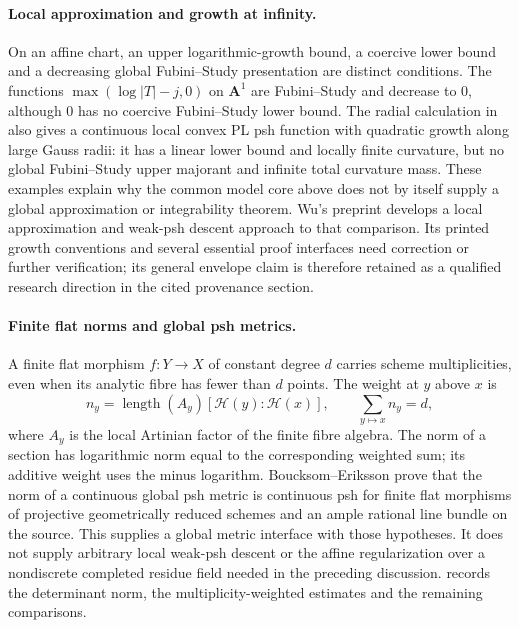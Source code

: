 \paragraph{Local approximation and growth at infinity.}
On an affine chart, an upper logarithmic-growth bound, a coercive lower
bound and a decreasing global Fubini--Study presentation are distinct
conditions. The functions
\(\max(\log|T|-j,0)\) on \(\mathbf A^1\) are Fubini--Study and decrease
to \(0\), although \(0\) has no coercive Fubini--Study lower bound.
The radial calculation in
 also gives a continuous local
convex PL psh function with quadratic growth along large Gauss radii:
it has a linear lower bound and locally finite curvature, but no global
Fubini--Study upper majorant and infinite total curvature mass.
These examples explain why the common model core above does not by
itself supply a global approximation or integrability theorem.
Wu's preprint \cite{Wu26LocalNApshV1} develops a local approximation and
weak-psh descent approach to that comparison. Its printed growth
conventions and several essential proof interfaces need correction or
further verification; its general envelope claim is therefore retained
as a qualified research direction in the cited provenance section.

\paragraph{Finite flat norms and global psh metrics.}
A finite flat morphism \(f:Y\to X\) of constant degree \(d\) carries
scheme multiplicities, even when its analytic fibre has fewer than \(d\)
points. The weight at \(y\) above \(x\) is
\[
 n_y=\operatorname{length}(A_y)
       [\mathcal H(y):\mathcal H(x)],
 \qquad \sum_{y\mapsto x}n_y=d,
\]
where \(A_y\) is the local Artinian factor of the finite fibre algebra.
The norm of a section has logarithmic norm equal to the corresponding
weighted sum; its additive weight uses the minus logarithm.
Boucksom--Eriksson \cite[Proposition~8.22]{BE21} prove that the norm of
a continuous global psh metric is continuous psh for finite flat
morphisms of projective geometrically reduced schemes and an ample
rational line bundle on the source. This supplies a global metric
interface with those hypotheses. It does not supply arbitrary local
weak-psh descent or the affine regularization over a nondiscrete
completed residue field needed in the preceding discussion.
 records the determinant norm,
the multiplicity-weighted estimates and the remaining comparisons.

